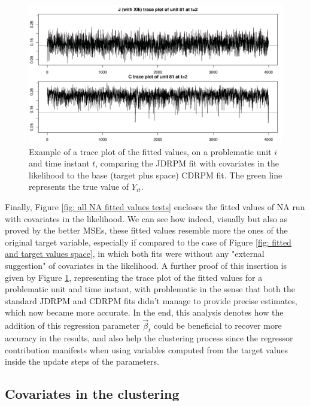 \documentclass[12pt,	%
	a4paper,		%
	twoside,		%
	openright,		%
	titlepage,%
	]{book}
\theoremstyle{definition}
\begin{document}
\begin{figure}[!ht]
    \centering
    \includegraphics[width=1\linewidth]{Testing/Covariates/NA lk improvement/trace_plots_with_Xlk.pdf}
    \caption[Trace plot of the fitted values for a fit with covariates in the likelihood]{Example of a trace plot of the fitted values, on a problematic unit $i$ and time instant $t$, comparing the JDRPM fit with covariates in the likelihood to the base (target plus space) CDRPM fit. The green line represents the true value of $Y_{it}$.}
    \label{fig: trace plot with Xlk}
\end{figure}


Finally, Figure \ref{fig: all NA fitted values tests} encloses the fitted values of NA run with covariates in the likelihood. We can see how indeed, visually but also as proved by the better MSEs, these fitted values resemble more the ones of the original target variable, especially if compared to the case of Figure \ref{fig: fitted and target values space}, in which both fits were without any "external suggestion" of covariates in the likelihood. A further proof of this insertion is given by Figure \ref{fig: trace plot with Xlk}, representing the trace plot of the fitted values for a problematic unit and time instant, with problematic in the sense that both the standard JDRPM and CDRPM fits didn't manage to provide precise estimates, which now became more accurate. In the end, this analysis denotes how the addition of this regression parameter $\vec{\beta}_t$ could be beneficial to recover more accuracy in the results, and also help the clustering process since the regressor contribution manifests when using variables computed from the target values inside the update steps of the parameters.  

\subsection{Covariates in the clustering}
\label{Covariates in the clustering}
\end{document}
